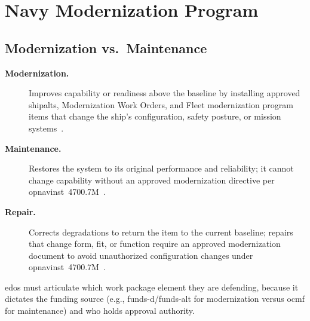 \documentclass[../main.tex]{subfiles}
\begin{document}
\section{Navy Modernization Program}

\subsection{Modernization vs.\ Maintenance}
\begin{description}
  \item[\textbf{Modernization.}] Improves capability or readiness above the baseline by installing approved \acp{shipalt}, Modernization Work Orders, and Fleet modernization program items that change the ship's configuration, safety posture, or mission systems~\autocite{edo-4-1-2-navy-modernization-2025,OPNAVINST4700-7M}.
  \item[\textbf{Maintenance.}] Restores the system to its original performance and reliability; it cannot change capability without an approved modernization directive per \ac{opnavinst}~4700.7M~\autocite{edo-4-1-2-navy-modernization-2025,COMFLTFORCOMINST4790-3}.
  \item[\textbf{Repair.}] Corrects degradations to return the item to the current baseline; repairs that change form, fit, or function require an approved modernization document to avoid unauthorized configuration changes under \ac{opnavinst}~4700.7M~\autocite{OPNAVINST4700-7M}.
\end{description}
\acp{edo} must articulate which work package element they are defending, because it dictates the funding source (e.g., \ac{funds-d}/\ac{funds-alt} for modernization versus \ac{ocmf} for maintenance) and who holds approval authority.
\end{document}
